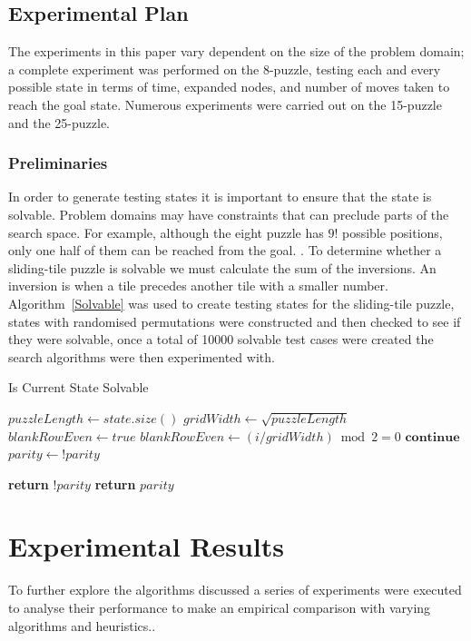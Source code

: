 \documentclass[final]{cmpreport}
\begin{document}
\subsection{Experimental Plan}
The experiments in this paper vary dependent on the size of the problem domain; a complete experiment was performed on the 8-puzzle, testing each and every possible state in terms of time, expanded nodes, and number of moves taken to reach the goal state. Numerous experiments were carried out on the 15-puzzle and the 25-puzzle. 
\subsubsection{Preliminaries}
In order to generate testing states it is important to ensure that the state is solvable. Problem domains may have constraints that can preclude parts of the search space. For example, although the eight puzzle has $9!$ possible positions, only one half of them can be reached from the goal. \citep{DBLP:journals/ci/CulbersonS98}. To determine whether a sliding-tile puzzle is solvable we must calculate the sum of the inversions.
An inversion is when a tile precedes another tile with a smaller number. 
Algorithm~\ref{Solvable} was used to create testing states for the sliding-tile puzzle, states with randomised permutations were constructed and then checked to see if they were solvable, once a total of 10000 solvable test cases were created the search algorithms were then experimented with.
\begin{algorithm}
	\caption{Is Current State Solvable}\label{Solvable}
	\begin{algorithmic}[H]
		\State $puzzleLength \gets state.size()$
		\State 	$gridWidth \gets \sqrt{puzzleLength}$
		\State $blankRowEven \gets true$
		\State $blankRowEven \gets (i / gridWidth) \bmod 2 = 0$
		\State $\textbf{continue} $
		\State $parity \gets !parity$
		\EndIf
		\EndFor
		\EndIf 
		\EndFor
		
		\State \textbf{return} $!parity$
		\EndIf
		\State \textbf{return} $parity$
		
		\EndProcedure
	\end{algorithmic}	
\end{algorithm}	


\section{Experimental Results}\label{Experimental Results}
To further explore the algorithms discussed a series of experiments were executed to analyse their performance to make an empirical comparison with varying algorithms and heuristics.. 
\end{document}
